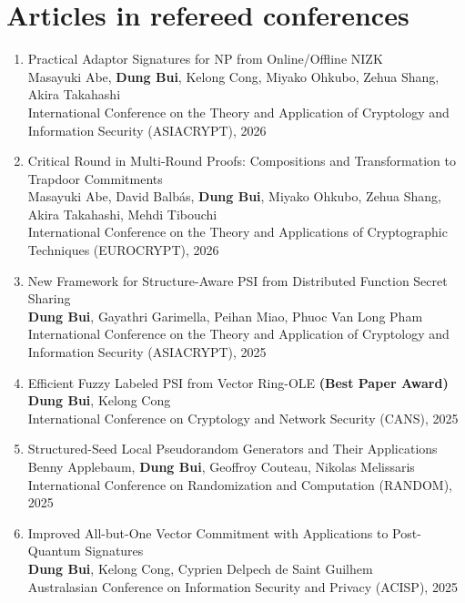 \documentclass[11pt]{article}
\begin{document}
\section{Articles in refereed conferences}
\begin{enumerate}
  \item Practical Adaptor Signatures for NP from Online/Offline NIZK\\
        Masayuki Abe, \textbf{Dung Bui}, Kelong Cong, Miyako Ohkubo, Zehua Shang, Akira Takahashi\\
        International Conference on the Theory and Application of Cryptology and Information Security (ASIACRYPT), 2026
  \item Critical Round in Multi-Round Proofs: Compositions and Transformation to Trapdoor Commitments\\
        Masayuki Abe, David Balb\'as, \textbf{Dung Bui}, Miyako Ohkubo, Zehua Shang, Akira Takahashi, Mehdi Tibouchi\\
        International Conference on the Theory and Applications of Cryptographic Techniques (EUROCRYPT), 2026
  \item New Framework for Structure-Aware PSI from Distributed Function Secret Sharing\\
        \textbf{Dung Bui}, Gayathri Garimella, Peihan Miao, Phuoc Van Long Pham\\
        International Conference on the Theory and Application of Cryptology and Information Security (ASIACRYPT), 2025
  \item Efficient Fuzzy Labeled PSI from Vector Ring-OLE \quad\textbf{(Best Paper Award)}\\
        \textbf{Dung Bui}, Kelong Cong\\
        International Conference on Cryptology and Network Security (CANS), 2025
  \item Structured-Seed Local Pseudorandom Generators and Their Applications\\
        Benny Applebaum, \textbf{Dung Bui}, Geoffroy Couteau, Nikolas Melissaris\\
        International Conference on Randomization and Computation (RANDOM), 2025
  \item Improved All-but-One Vector Commitment with Applications to Post-Quantum Signatures\\
        \textbf{Dung Bui}, Kelong Cong, Cyprien Delpech de Saint Guilhem\\
        Australasian Conference on Information Security and Privacy (ACISP), 2025

\end{enumerate}
\end{document}
